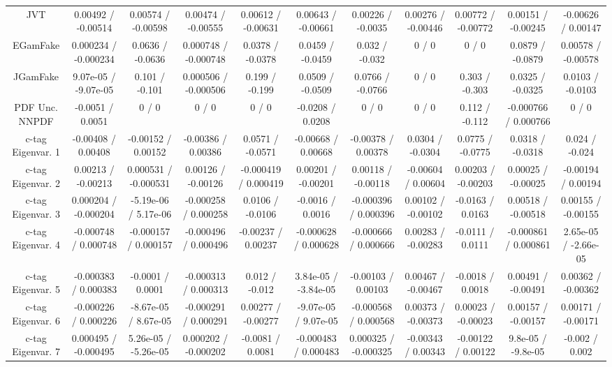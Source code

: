 \begin{table}[htbp]
\begin{center}
\begin{tabular}{|c|c|c|c|c|c|c|c|c|c|c|}
  JVT & 0.00492 / -0.00514 & 0.00574 / -0.00598 & 0.00474 / -0.00555 & 0.00612 / -0.00631 & 0.00643 / -0.00661 & 0.00226 / -0.0035 & 0.00276 / -0.00446 & 0.00772 / -0.00772 & 0.00151 / -0.00245 & -0.00626 / 0.00147 \\ 
  EGamFake & 0.000234 / -0.000234 & 0.0636 / -0.0636 & 0.000748 / -0.000748 & 0.0378 / -0.0378 & 0.0459 / -0.0459 & 0.032 / -0.032 & 0 / 0 & 0 / 0 & 0.0879 / -0.0879 & 0.00578 / -0.00578 \\ 
  JGamFake & 9.07e-05 / -9.07e-05 & 0.101 / -0.101 & 0.000506 / -0.000506 & 0.199 / -0.199 & 0.0509 / -0.0509 & 0.0766 / -0.0766 & 0 / 0 & 0.303 / -0.303 & 0.0325 / -0.0325 & 0.0103 / -0.0103 \\ 
  PDF Unc. NNPDF & -0.0051 / 0.0051 & 0 / 0 & 0 / 0 & 0 / 0 & -0.0208 / 0.0208 & 0 / 0 & 0 / 0 & 0.112 / -0.112 & -0.000766 / 0.000766 & 0 / 0 \\ 
  c-tag Eigenvar. 1 & -0.00408 / 0.00408 & -0.00152 / 0.00152 & -0.00386 / 0.00386 & 0.0571 / -0.0571 & -0.00668 / 0.00668 & -0.00378 / 0.00378 & 0.0304 / -0.0304 & 0.0775 / -0.0775 & 0.0318 / -0.0318 & 0.024 / -0.024 \\ 
  c-tag Eigenvar. 2 & 0.00213 / -0.00213 & 0.000531 / -0.000531 & 0.00126 / -0.00126 & -0.000419 / 0.000419 & 0.00201 / -0.00201 & 0.00118 / -0.00118 & -0.00604 / 0.00604 & 0.00203 / -0.00203 & 0.00025 / -0.00025 & -0.00194 / 0.00194 \\ 
  c-tag Eigenvar. 3 & 0.000204 / -0.000204 & -5.19e-06 / 5.17e-06 & -0.000258 / 0.000258 & 0.0106 / -0.0106 & -0.0016 / 0.0016 & -0.000396 / 0.000396 & 0.00102 / -0.00102 & -0.0163 / 0.0163 & 0.00518 / -0.00518 & 0.00155 / -0.00155 \\ 
  c-tag Eigenvar. 4 & -0.000748 / 0.000748 & -0.000157 / 0.000157 & -0.000496 / 0.000496 & -0.00237 / 0.00237 & -0.000628 / 0.000628 & -0.000666 / 0.000666 & 0.00283 / -0.00283 & -0.0111 / 0.0111 & -0.000861 / 0.000861 & 2.65e-05 / -2.66e-05 \\ 
  c-tag Eigenvar. 5 & -0.000383 / 0.000383 & -0.0001 / 0.0001 & -0.000313 / 0.000313 & 0.012 / -0.012 & 3.84e-05 / -3.84e-05 & -0.00103 / 0.00103 & 0.00467 / -0.00467 & -0.0018 / 0.0018 & 0.00491 / -0.00491 & 0.00362 / -0.00362 \\ 
  c-tag Eigenvar. 6 & -0.000226 / 0.000226 & -8.67e-05 / 8.67e-05 & -0.000291 / 0.000291 & 0.00277 / -0.00277 & -9.07e-05 / 9.07e-05 & -0.000568 / 0.000568 & 0.00373 / -0.00373 & 0.00023 / -0.00023 & 0.00157 / -0.00157 & 0.00171 / -0.00171 \\ 
  c-tag Eigenvar. 7 & 0.000495 / -0.000495 & 5.26e-05 / -5.26e-05 & 0.000202 / -0.000202 & -0.0081 / 0.0081 & -0.000483 / 0.000483 & 0.000325 / -0.000325 & -0.00343 / 0.00343 & -0.00122 / 0.00122 & 9.8e-05 / -9.8e-05 & -0.002 / 0.002 \\ 

\end{tabular}
\end{center}
\end{table}
